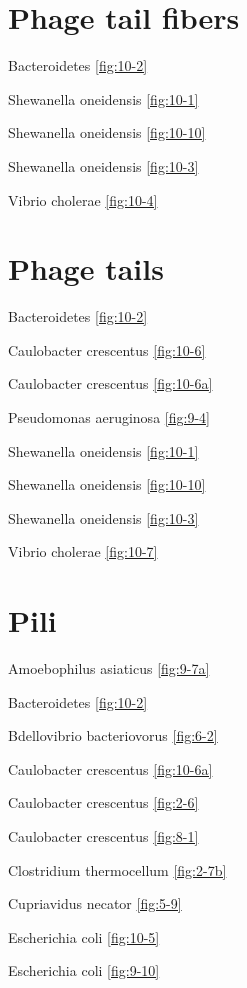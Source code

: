 \documentclass[]{tufte-book}
\begin{document}
\section*{Phage tail fibers}\label{phage-tail-fibers}

Bacteroidetes \ref{fig:10-2}

Shewanella oneidensis \ref{fig:10-1}

Shewanella oneidensis \ref{fig:10-10}

Shewanella oneidensis \ref{fig:10-3}

Vibrio cholerae \ref{fig:10-4}

\section*{Phage tails}\label{phage-tails}

Bacteroidetes \ref{fig:10-2}

Caulobacter crescentus \ref{fig:10-6}

Caulobacter crescentus \ref{fig:10-6a}

Pseudomonas aeruginosa \ref{fig:9-4}

Shewanella oneidensis \ref{fig:10-1}

Shewanella oneidensis \ref{fig:10-10}

Shewanella oneidensis \ref{fig:10-3}

Vibrio cholerae \ref{fig:10-7}

\section*{Pili}\label{pili}

Amoebophilus asiaticus \ref{fig:9-7a}

Bacteroidetes \ref{fig:10-2}

Bdellovibrio bacteriovorus \ref{fig:6-2}

Caulobacter crescentus \ref{fig:10-6a}

Caulobacter crescentus \ref{fig:2-6}

Caulobacter crescentus \ref{fig:8-1}

Clostridium thermocellum \ref{fig:2-7b}

Cupriavidus necator \ref{fig:5-9}

Escherichia coli \ref{fig:10-5}

Escherichia coli \ref{fig:9-10}
\end{document}
